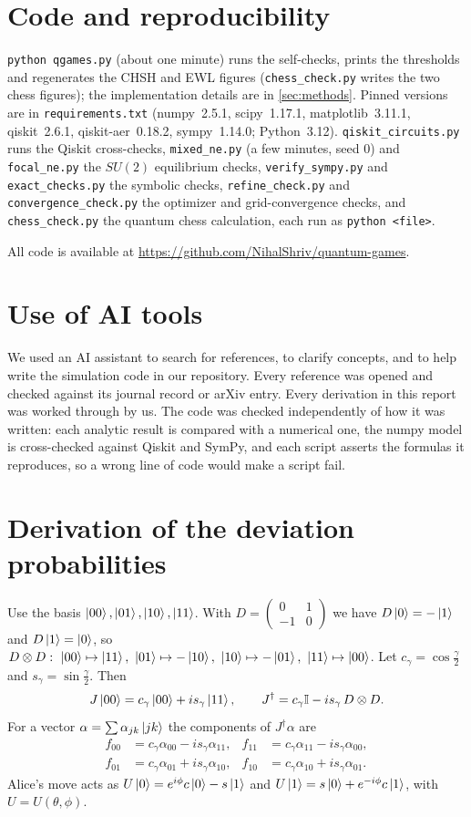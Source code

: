 \documentclass[11pt,a4paper]{article}
\begin{document}
\section*{Code and reproducibility}
\begingroup\sloppy\texttt{python qgames.py} (about one minute) runs the self-checks, prints the thresholds and regenerates the CHSH and EWL figures (\texttt{chess\_check.py} writes the two chess figures); the implementation details are in \cref{sec:methods}. Pinned versions are in \texttt{requirements.txt} (numpy~2.5.1, scipy~1.17.1, matplotlib~3.11.1, qiskit~2.6.1, qiskit-aer~0.18.2, sympy~1.14.0; Python~3.12). \texttt{qiskit\_circuits.py} runs the Qiskit cross-checks, \texttt{mixed\_ne.py} (a few minutes, seed 0) and \texttt{focal\_ne.py} the $SU(2)$ equilibrium checks, \texttt{verify\_sympy.py} and \texttt{exact\_checks.py} the symbolic checks, \texttt{refine\_check.py} and \texttt{convergence\_check.py} the optimizer and grid-convergence checks, and \texttt{chess\_check.py} the quantum chess calculation, each run as \texttt{python <file>}.\par\endgroup All code is available at \url{https://github.com/NihalShriv/quantum-games}.

\section*{Use of AI tools}
We used an AI assistant to search for references, to clarify concepts, and to help write the simulation code in our repository. Every reference was opened and checked against its journal record or arXiv entry. Every derivation in this report was worked through by us. The code was checked independently of how it was written: each analytic result is compared with a numerical one, the numpy model is cross-checked against Qiskit and SymPy, and each script asserts the formulas it reproduces, so a wrong line of code would make a script fail.
\appendix
\section{Derivation of the deviation probabilities}\label{app:derivation}
Use the basis $\ket{00},\ket{01},\ket{10},\ket{11}$. With $D=\begin{pmatrix}0&1\\-1&0\end{pmatrix}$ we have $D\ket0=-\ket1$ and $D\ket1=\ket0$, so
$D\otimes D:\ \ket{00}\mapsto\ket{11},\ \ket{01}\mapsto-\ket{10},\ \ket{10}\mapsto-\ket{01},\ \ket{11}\mapsto\ket{00}$.
Let $c_\gamma=\cos\frac\gamma2$ and $s_\gamma=\sin\frac\gamma2$. Then
\[
J\ket{00}=c_\gamma\ket{00}+i s_\gamma\ket{11},\qquad
J^\dagger=c_\gamma\mathbb I-i s_\gamma\,D\otimes D .
\]
For a vector $\alpha=\sum\alpha_{jk}\ket{jk}$ the components of $J^\dagger\alpha$ are
\begin{align}
f_{00}&=c_\gamma\alpha_{00}-is_\gamma\alpha_{11}, & f_{11}&=c_\gamma\alpha_{11}-is_\gamma\alpha_{00},\label{eq:Jd}\\
f_{01}&=c_\gamma\alpha_{01}+is_\gamma\alpha_{10}, & f_{10}&=c_\gamma\alpha_{10}+is_\gamma\alpha_{01}.\nonumber
\end{align}
Alice's move acts as $U\ket0=e^{i\phi}c\ket0-s\ket1$ and $U\ket1=s\ket0+e^{-i\phi}c\ket1$, with $U=U(\theta,\phi)$.
\end{document}
